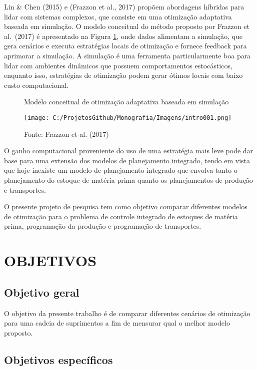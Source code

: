 \documentclass[
]{book}
\begin{document}
Lin \& Chen (2015) e (Frazzon et al., 2017) propõem abordagens híbridas para lidar com sistemas complexos, que consiste em uma otimização adaptativa baseada em simulação. O modelo conceitual do método proposto por Frazzon et al.~(2017) é apresentado na Figura \ref{fig:intro001}, onde dados alimentam a simulação, que gera cenários e executa estratégias locais de otimização e fornece feedback para aprimorar a simulação. A simulação é uma ferramenta particularmente boa para lidar com ambientes dinâmicos que possuem comportamentos estocásticos, enquanto isso, estratégias de otimização podem gerar ótimos locais com baixo custo computacional.

\begin{figure}
\centering
\caption{Modelo conceitual de otimização adaptativa baseada em simulação}
  \centering
  \texttt{[image: C:/ProjetosGithub/Monografia/Imagens/intro001.png]}
\caption*{Fonte: Frazzon et al. (2017)}
\label{fig:intro001}
\end{figure}

O ganho computacional proveniente do uso de uma estratégia mais leve pode dar base para uma extensão dos modelos de planejamento integrado, tendo em vista que hoje inexiste um modelo de planejamento integrado que envolva tanto o planejamento do estoque de matéria prima quanto os planejamentos de produção e transportes.

O presente projeto de pesquisa tem como objetivo comparar diferentes modelos de otimização para o problema de controle integrado de estoques de matéria prima, programação da produção e programação de transportes.

\hypertarget{objetivos}{%
\section{OBJETIVOS}\label{objetivos}}

\hypertarget{objetivo-geral}{%
\subsection{Objetivo geral}\label{objetivo-geral}}

O objetivo da presente trabalho é de comparar diferentes cenários de otimização para uma cadeia de suprimentos a fim de mensurar qual o melhor modelo proposto.

\hypertarget{objetivos-especuxedficos}{%
\subsection{Objetivos específicos}\label{objetivos-especuxedficos}}
\end{document}
